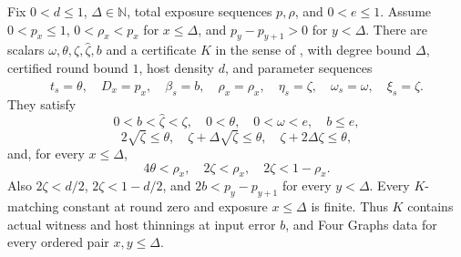 \begin{lemma}
Fix $0<d\leq1$, $\Delta\in\mathbb N$, total exposure sequences $p,\rho$,
and $0<e\leq1$. Assume $0<p_x\leq1$, $0<\rho_x<p_x$ for
$x\leq\Delta$, and $p_y-p_{y+1}>0$ for $y<\Delta$.
There are scalars $\omega,\theta,\zeta,\widehat\zeta,b$ and a
certificate $K$ in the sense of ,
with degree bound $\Delta$, certified round bound $1$, host density $d$,
and parameter sequences
\[
 t_s=\theta,\quad D_x=p_x,\quad \beta_s=b,\quad
 \rho_x=\rho_x,\quad \eta_s=\zeta,\quad
 \omega_s=\omega,\quad \xi_s=\widehat\zeta.
\]
They satisfy
\[
 0<b<\widehat\zeta<\zeta,\quad 0<\theta,\quad
 0<\omega<e,\quad b\leq e,
\]
\[
 2\sqrt\zeta\leq\theta,\quad
 \zeta+\Delta\sqrt\zeta\leq\theta,\quad
 \zeta+2\Delta\zeta\leq\theta,
\]
and, for every $x\leq\Delta$,
\[
 4\theta<\rho_x,\quad 2\zeta<\rho_x,\quad
 2\zeta<1-\rho_x.
\]
Also $2\zeta<d/2$, $2\zeta<1-d/2$, and
$2b<p_y-p_{y+1}$ for every $y<\Delta$.
Every $K$-matching constant at round zero and exposure $x\leq\Delta$
is finite. Thus $K$ contains actual witness and host thinnings at input
error $b$, and Four Graphs data for every ordered pair $x,y\leq\Delta$.
\end{lemma}
